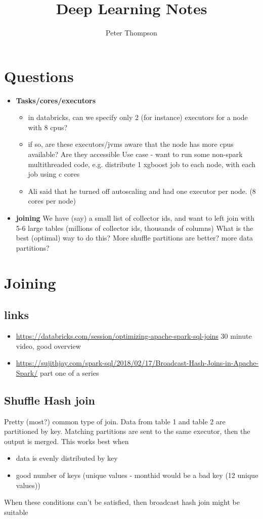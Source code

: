 \documentclass{article}
\title{Deep Learning Notes}
\author{Peter Thompson}
\begin{document}
\section{Questions}
\begin{itemize}
    \item {\bf Tasks/cores/executors}
    \begin{itemize}
        \item in databricks, can we specify only 2 (for instance) executors for a node with 8 cpus?
        \item if so, are these executors/jvms aware that the node has more cpus available? Are they accessible
        Use case - want to run some non-spark multithreaded code, e.g. distribute 1 xgboost job to each node, with each job using c cores
        \item Ali said that he turned off autoscaling and had one executor per node. (8 cores per node)
    \end{itemize}
    \item {\bf joining} 
        We have (say) a small list of collector ids, and want to left join with 5-6 large tables (millions of collector ids, thousands of columns)
        What is the best (optimal) way to do this? More shuffle partitions are better? more data partitions?  
    \end{itemize}

\section{Joining}
    \subsection{links}
    \begin{itemize}
        \item \url{https://databricks.com/session/optimizing-apache-spark-sql-joins} 30 minute video, good overview
        \item \url{https://sujithjay.com/spark-sql/2018/02/17/Broadcast-Hash-Joins-in-Apache-Spark/} part one of a series
    \end{itemize}

    \subsection{Shuffle Hash join}
    Pretty (most?) common type of join. Data from table 1 and table 2 are partitioned by key. Matching partitions are sent to the same executor, then the output is merged.
    This works best when
    \begin{itemize}
        \item data is evenly distributed by key
        \item good number of keys (unique values - monthid would be a bad key (12 unique values))
    \end{itemize}
    When these conditions can't be satisfied, then broadcast hash join might be suitable
\end{document}
